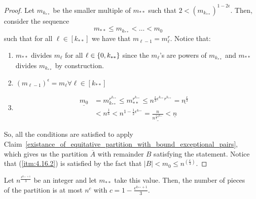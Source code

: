         \begin{proof}
            Let $m_{k_{**}}$ be the smaller multiple of $m_{**}$ such that $2 < (m_{k_{**}})^{1-2\epsilon}$.
            Then, consider the sequence
            \[
                m_{**} \leq m_{k_{**}} < \dots < m_0
            \]
            such that for all $\ell \in [k_{**}]$ we have that $m_{\ell-1} = m_\ell^r$.
            Notice that:
            \begin{enumerate}
                \item $m_{**}$ divides $m_\ell$ for all $\ell \in \left\{ 0, k_{**} \right\}$ since the $m_\ell$'s are powers of $m_{k_{**}}$
                    and $m_{**}$ divides $m_{k_{**}}$ by construction.
                \item $(m_{\ell-1})^\epsilon = m_\ell \forall \ell \in [k_{**}]$
                \item \[
                    \begin{split}
                        \underline{m_0}
                            & = m_{k_{**}}^{r^{k_{**}}}
                                \leq m_{**}^{r^{k_{**}}}
                                \leq n^{\frac{\epsilon}{3}\epsilon^{k_{**}}r^{k_{**}}}
                                = \underline{n^{\frac{\epsilon}{3}}} \\
                            & < n^{\frac{1}{6}}
                                < n^{1-\frac{1}{2}\epsilon^{k_{**}}}
                                = \underline{\frac{n}{n^{\frac{1}{2}\epsilon^{k_{**}}}}}
                                < \underline{n}
                    \end{split}
                \]
            \end{enumerate}
            So, all the conditions are satisfied to apply Claim~\ref{existance_of_equitative_partition_with_bound_exceptional_pairs},
                which gives us the partition $\overline{A}$ with remainder $B$ satisfying the statement.
            Notice that (\ref{itm:4.16.2}) is satisfied by the fact that $|B| < m_0 \leq n^{\left(\frac{\epsilon}{3}\right)}$.
        \end{proof}

    \remark
    Let $n^{\frac{\epsilon^{k_{**}+1}}{3}}$ be an integer and let $m_{**}$ take this value.
    Then, the number of pieces of the partition is at most $n^c$ with $c = 1 - \frac{\epsilon^{k_{**}+1}}{3}$.

